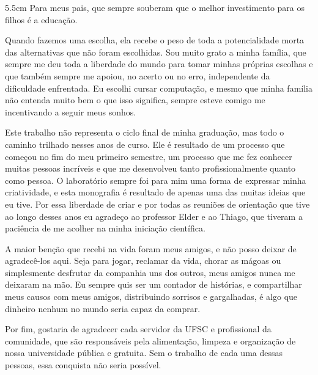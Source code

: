 \begin{dedicatoria}
	\vspace*{\fill}
	\noindent
	\begin{adjustwidth*}{}{5.5cm} 
		\raggedleft       
		Para meus pais, que sempre souberam que o melhor investimento para os filhos é a educação.
	\end{adjustwidth*}
\end{dedicatoria}

\begin{agradecimentos}

    Quando fazemos uma escolha, ela recebe o peso de toda a potencialidade morta das alternativas que não foram escolhidas. Sou muito grato a minha família, que sempre me deu toda a liberdade do mundo para tomar minhas próprias escolhas e que também sempre me apoiou, no acerto ou no erro, independente da dificuldade enfrentada. Eu escolhi cursar computação, e mesmo que minha família não entenda muito bem o que isso significa, sempre esteve comigo me incentivando a seguir meus sonhos.

	Este trabalho não representa o ciclo final de minha graduação, mas todo o caminho trilhado nesses anos de curso. Ele é resultado de um processo que começou no fim do meu primeiro semestre, um processo que me fez conhecer muitas pessoas incríveis e que me desenvolveu tanto profissionalmente quanto como pessoa. O laboratório sempre foi para mim uma forma de expressar minha criatividade, e esta monografia é resultado de apenas uma das muitas ideias que eu tive. Por essa liberdade de criar e por todas as reuniões de orientação que tive ao longo desses anos eu agradeço ao professor Elder e ao Thiago, que tiveram a paciência de me acolher na minha iniciação científica.
	
	A maior benção que recebi na vida foram meus amigos, e não posso deixar de agradecê-los aqui. Seja para jogar, reclamar da vida, chorar as mágoas ou simplesmente desfrutar da companhia uns dos outros, meus amigos nunca me deixaram na mão. Eu sempre quis ser um contador de histórias, e compartilhar meus causos com meus amigos, distribuindo sorrisos e gargalhadas, é algo que dinheiro nenhum no mundo seria capaz da comprar.
	
	Por fim, gostaria de agradecer cada servidor da UFSC e profissional da comunidade, que são responsáveis pela alimentação, limpeza e organização de nossa universidade pública e gratuita. Sem o trabalho de cada uma dessas pessoas, essa conquista não seria possível.

\end{agradecimentos}

